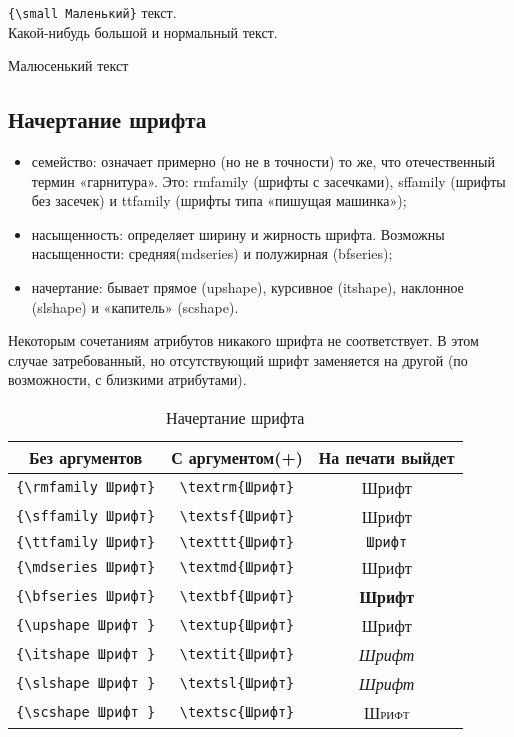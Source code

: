 \documentclass[a4paper,12pt]{article}%
\theoremstyle{plain}%
\theoremstyle{definition}%
\theoremstyle{remark}%
\begin{document}
\noindent\verb|{\small Маленький}| текст. \\%
Какой-нибудь \Large большой \normalsize и нормальный текст. \\%
\begin{tiny}%
Малюсенький текст
\end{tiny}



\subsection{Начертание шрифта}

\begin{itemize}
\item семейство: означает примерно (но не в точности) то же, что отечественный термин «гарнитура». Это: rmfamily (шрифты с засечками), sffamily (шрифты без засечек) и ttfamily (шрифты типа «пишущая машинка»); 
\item насыщенность: определяет ширину и жирность шрифта. Возможны насыщенности: средняя(mdseries) и полужирная (bfseries);
\item начертание: бывает прямое (upshape), курсивное (itshape), наклонное (slshape) и «капитель» (scshape).
\end{itemize}

\noindent Некоторым сочетаниям атрибутов никакого шрифта не соответствует. В этом случае затребованный, но отсутствующий шрифт заменяется на другой (по возможности, с близкими атрибутами).

\begin{table}[!h]
\caption{Начертание шрифта}
\centering
\begin{tabular}{|c|c|c|}
 \hline Без аргументов & С аргументом(+) & На печати выйдет \\
\hline \verb|{\rmfamily Шрифт}| & \verb|\textrm{Шрифт}| & \textrm{Шрифт} \\
\hline \verb|{\sffamily Шрифт}| & \verb|\textsf{Шрифт}| & \textsf{Шрифт} \\
\hline \verb|{\ttfamily Шрифт}| & \verb|\texttt{Шрифт}| & \texttt{Шрифт} \\
\hline \verb|{\mdseries Шрифт}| & \verb|\textmd{Шрифт}| & \textmd{Шрифт} \\
\hline \verb|{\bfseries Шрифт}| & \verb|\textbf{Шрифт}| & \textbf{Шрифт} \\
\hline \verb|{\upshape Шрифт }| & \verb|\textup{Шрифт}| & \textup{Шрифт} \\
\hline \verb|{\itshape Шрифт }| & \verb|\textit{Шрифт}| & \textit{Шрифт} \\
\hline \verb|{\slshape Шрифт }| & \verb|\textsl{Шрифт}| & \textsl{Шрифт} \\
\hline \verb|{\scshape Шрифт }| & \verb|\textsc{Шрифт}| & \textsc{Шрифт} \\
\hline
\end{tabular}
\end{table}
\end{document}

